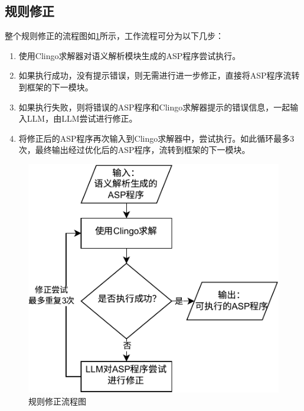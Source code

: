 \subsection{规则修正}
整个规则修正的流程图如\ref{figure:rule-fix}所示，工作流程可分为以下几步：
\begin{enumerate}[nosep]
\item 使用Clingo求解器对语义解析模块生成的ASP程序尝试执行。
\item 如果执行成功，没有提示错误，则无需进行进一步修正，直接将ASP程序流转到框架的下一模块。
\item 如果执行失败，则将错误的ASP程序和Clingo求解器提示的错误信息，一起输入LLM，由LLM尝试进行修正。
\item 将修正后的ASP程序再次输入到Clingo求解器中，尝试执行。如此循环最多3次，最终输出经过优化后的ASP程序，流转到框架的下一模块。
\end{enumerate}
\begin{figure}[h]
\centering
\includegraphics[scale=1.5]{figures/rule-fix-crop.pdf}
\caption{规则修正流程图}
\label{figure:rule-fix}
\end{figure}

